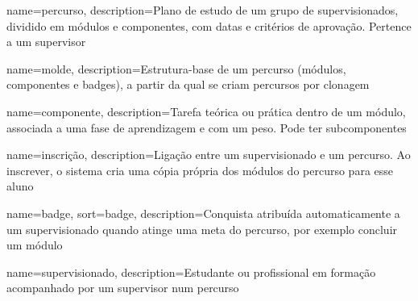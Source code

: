 {
    name=percurso,
    description={Plano de estudo de um grupo de supervisionados, dividido em módulos e componentes, com datas e critérios de aprovação. Pertence a um supervisor}
}

{
    name=molde,
    description={Estrutura-base de um percurso (módulos, componentes e badges), a partir da qual se criam percursos por clonagem}
}

{
    name=componente,
    description={Tarefa teórica ou prática dentro de um módulo, associada a uma fase de aprendizagem e com um peso. Pode ter subcomponentes}
}

{
    name=inscrição,
    description={Ligação entre um supervisionado e um percurso. Ao inscrever, o sistema cria uma cópia própria dos módulos do percurso para esse aluno}
}

{
    name=badge,
    sort=badge,
    description={Conquista atribuída automaticamente a um supervisionado quando atinge uma meta do percurso, por exemplo concluir um módulo}
}

{
    name=supervisionado,
    description={Estudante ou profissional em formação acompanhado por um supervisor num percurso}
}
